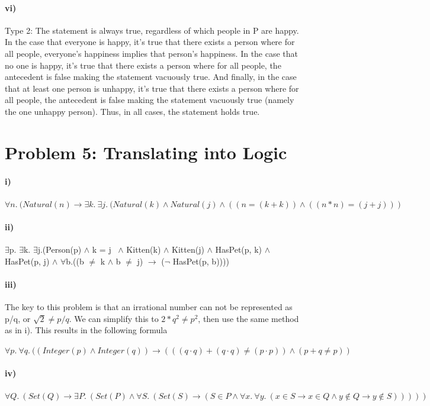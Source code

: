 \documentclass[10pt,letter]{article}
\begin{document}
\paragraph{vi)} Type 2: The statement is always true, regardless of which people in P are happy. In the case that everyone is happy, it's true that there exists a person where for all people, everyone's happiness implies that person's happiness. In the case that no one is happy, it's true that there exists a person where for all people, the antecedent is false making the statement vacuously true. And finally, in the case that at least one person is unhappy, it's true that there exists a person where for all people, the antecedent is false making the statement vacuously true (namely the one unhappy person). Thus, in all cases, the statement holds true.

\section*{Problem 5: Translating into Logic}

\paragraph{i)} $\forall n .\ (Natural(n) \rightarrow \exists k .\ \exists j .\ (Natural(k) \wedge Natural(j) \wedge ((n = (k + k)) \wedge ((n * n) = (j + j)))$

\paragraph{ii)} $ \exists$p. $\exists$k.  $\exists$j.(Person(p) $\wedge$ k \not = j \ $\wedge$ Kitten(k) $\wedge$ Kitten(j) $\wedge$ HasPet(p, k) $\wedge$ HasPet(p, j) $\wedge$ $\forall$b.((b $\neq$ k  $\wedge$ b $\neq$   j) $\rightarrow$ ($\neg$ HasPet(p, b))))

\paragraph{iii)} The key to this problem is that an irrational number can not be represented as p/q, or $\sqrt{2} \not = p/q$. We can simplify this to $2 * q^2 \not = p^2$, then use the same method as in i). This results in the following formula

$\forall p .\ \forall q .\ ((Integer(p) \wedge Integer(q)) \rightarrow (((q \cdot q) + (q \cdot q) \not = (p \cdot p)) \wedge (p + q \not = p))$

\paragraph{iv)}
$\forall Q .\ (Set(Q) \rightarrow \exists P .\ (Set(P) \wedge \forall S .\ (Set(S) \rightarrow (S \in P \wedge \forall x .\ \forall y .\ (x \in S \rightarrow x \in Q \wedge y \not \in Q \rightarrow y \not \in S)))))$
\end{document}
